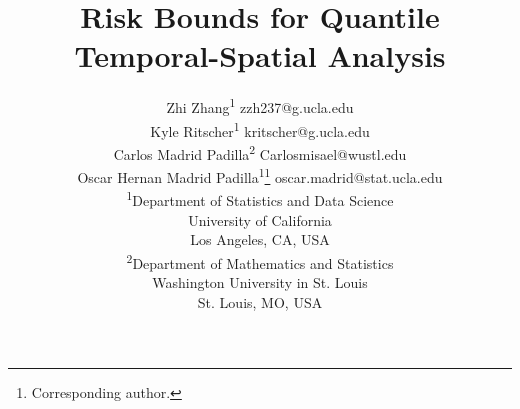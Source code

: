 \documentclass[twoside,11pt]{article}
\begin{document}
\allowdisplaybreaks[3]

\title{Risk Bounds for Quantile Temporal-Spatial Analysis}


\author{
\name Zhi Zhang\textsuperscript{1} \email zzh237@g.ucla.edu \\
\name Kyle Ritscher\textsuperscript{1} \email kritscher@g.ucla.edu \\
\name Carlos Madrid Padilla\textsuperscript{2} \email Carlosmisael@wustl.edu \\
\name Oscar Hernan Madrid Padilla\textsuperscript{1}\thanks{Corresponding author.} \email oscar.madrid@stat.ucla.edu \\
\textsuperscript{1}\addr Department of Statistics and Data Science\\
University of California\\
Los Angeles, CA, USA \\
\textsuperscript{2}\addr Department of Mathematics and Statistics\\
Washington University in St. Louis\\
St. Louis, MO, USA
}



\maketitle
\end{document}
